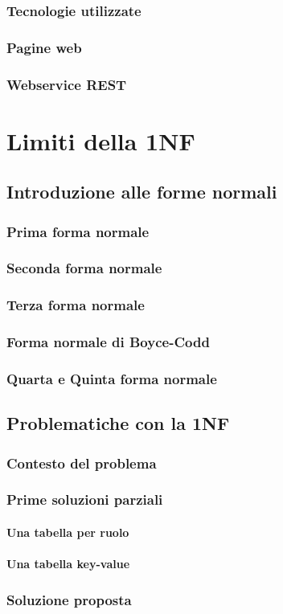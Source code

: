 \documentclass[10pt,twoside,cucitura]{toptesi}
\begin{document}
\section{Tecnologie utilizzate}
\section{Pagine web}
\section{Webservice REST}

\part{Limiti della 1NF}

\chapter{Introduzione alle forme normali}

\section{Prima forma normale}
\section{Seconda forma normale}
\section{Terza forma normale}
\section{Forma normale di Boyce-Codd}
\section{Quarta e Quinta forma normale}

\chapter{Problematiche con la 1NF}

\section{Contesto del problema}

\section{Prime soluzioni parziali}
\subsection{Una tabella per ruolo}
\subsection{Una tabella key-value}

\section{Soluzione proposta}
\label{sec:soluzione}
\end{document}
